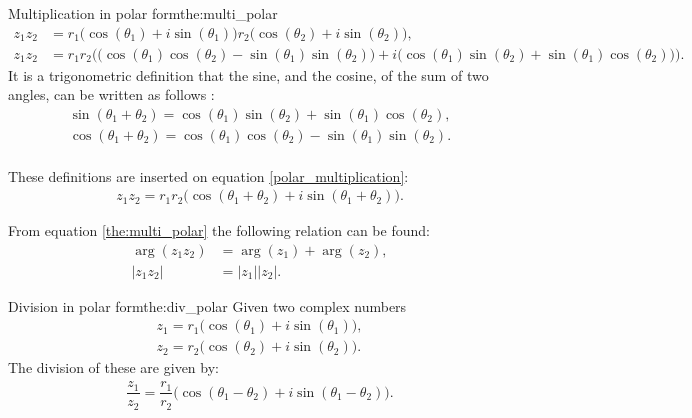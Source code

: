 \begin{prof}{Multiplication in polar form}{the:multi_polar}
\begin{align}
z_1 z_2&=r_1 \big( \cos(\theta_1)+ i \sin(\theta_1)\big)r_2 \big( \cos(\theta_2)+ i \sin(\theta_2)\big), \nonumber
\\
\label{polar_multiplication}
z_1z_2&=r_1r_2\Big( \big(\cos(\theta_1)\cos(\theta_2)-\sin(\theta_1) \sin(\theta_2)\big)+i\big(\cos(\theta_1)\sin(\theta_2)+\sin(\theta_1)\cos(\theta_2)\big)\Big).
\end{align}
It is a trigonometric definition that the sine, and the cosine, of the sum of two angles, can be written as follows \cite[p. A-14 Appendicies]{calc}:
\\
\begin{align} 
\sin(\theta_1+\theta_2)=\cos(\theta_1)\sin(\theta_2)+\sin(\theta_1)\cos(\theta_2), \label{sum_cos_sin}
\end{align}
\begin{align*}
\cos(\theta_1+\theta_2)=\cos(\theta_1)\cos(\theta_2)-\sin(\theta_1)\sin(\theta_2).
\end{align*}
\\
These definitions are inserted on equation \eqref{polar_multiplication}:
\\
\begin{align*}
z_1 z_2=r_1r_2\big( \cos(\theta_1+\theta_2)+ i \sin(\theta_1+\theta_2)\big).
\end{align*}
\end{prof}
\noindent
From equation \ref{the:multi_polar} the following relation can be found:
\begin{align}
\arg(z_1z_2)&=\arg(z_1)+\arg(z_2),
\\
|z_1z_2|&=|z_1||z_2|.
\end{align}

\begin{theorem}{Division in polar form}{the:div_polar}
Given two complex numbers
\begin{align*}
z_1=r_1\big(\cos(\theta_1)+i\sin(\theta_1)\big), 
\\
z_2=r_2\big(\cos(\theta_2)+i\sin(\theta_2)\big).
\end{align*}
The division of these are given by:
\begin{align*}
\dfrac{z_1}{z_2}=\dfrac{r_1}{r_2}\Big( \cos(\theta_1-\theta_2)+ i \sin(\theta_1-\theta_2)\Big).
\end{align*}
\end{theorem}


